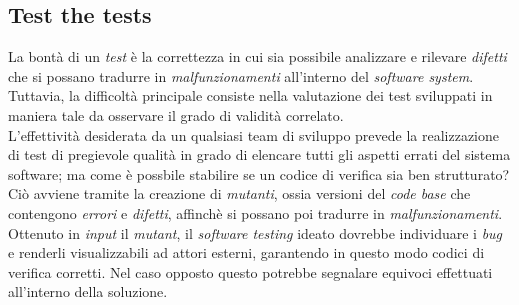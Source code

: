 \documentclass{article}
\begin{document}
\subsection*{Test the tests}
\large
La bontà di un \textit{test} è la correttezza in cui sia possibile analizzare e rilevare \textit{difetti} che si possano tradurre in \textit{malfunzionamenti} all'interno del \textit{software system}. Tuttavia, la difficoltà principale consiste nella valutazione dei test sviluppati in maniera tale da osservare il grado di validità correlato.\vspace*{14pt}\\
L'effettività desiderata da un qualsiasi team di sviluppo prevede la realizzazione di test di pregievole qualità in grado di elencare tutti gli aspetti errati del sistema software; ma come è possbile stabilire se un codice di verifica sia ben strutturato?\vspace*{14pt}\\
Ciò avviene tramite la creazione di \textit{mutanti}, ossia versioni del \textit{code base} che contengono \textit{errori} e \textit{difetti}, affinchè si possano poi tradurre in \textit{malfunzionamenti}. Ottenuto in \textit{input} il \textit{mutant}, il \textit{software testing} ideato dovrebbe individuare i \textit{bug} e renderli visualizzabili ad attori esterni, garantendo in questo modo codici di verifica corretti. Nel caso opposto questo potrebbe segnalare equivoci effettuati all'interno della soluzione.
\end{document}
